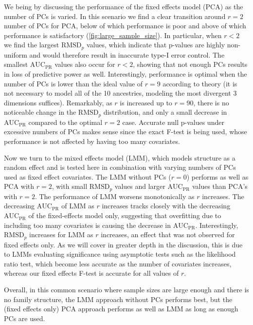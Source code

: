 \documentclass[11pt]{article}
\newcommand{\rmsd}{\text{RMSD}_p}
\newcommand{\auc}{\text{AUC}_\text{PR}}
\begin{document}
We being by discussing the performance of the fixed effects model (PCA) as the number of PCs is varied.
In this scenario we find a clear transition around $r = 2$ number of PCs for PCA, below of which performance is poor and above of which performance is satisfactory (\cref{fig:large_sample_size}).
In particular, when $r < 2$ we find the largest $\rmsd$ values, which indicate that p-values are highly non-uniform and would therefore result in inaccurate type-I error control.
The smallest $\auc$ values also occur for $r < 2$, showing that not enough PCs results in loss of predictive power as well.
Interestingly, performance is optimal when the number of PCs is lower than the ideal value of $r=9$ according to theory (it is not necessary to model all of the 10 ancestries, modeling the most divergent 3 dimensions suffices).
Remarkably, as $r$ is increased up to $r = 90$, there is no noticeable change in the $\rmsd$ distribution, and only a small decrease in $\auc$ compared to the optimal $r = 2$ case.
Accurate null p-values under excessive numbers of PCs makes sense since the exact F-test is being used, whose performance is not affected by having too many covariates.

Now we turn to the mixed effects model (LMM), which models structure as a random effect and is tested here in combination with varying numbers of PCs used as fixed effect covariates.
The LMM without PCs ($r=0$) performs as well as PCA with $r = 2$, with small $\rmsd$ values and larger $\auc$ values than PCA's with $r=2$.
The performance of LMM worsens monotonically as $r$ increases.
The decreasing $\auc$ of LMM as $r$ increases tracks closely with the decreasing $\auc$ of the fixed-effects model only, suggesting that overfitting due to including too many covariates is causing the decrease in $\auc$.
Interestingly, $\rmsd$ increases for LMM as $r$ increases, an effect that was not observed for fixed effects only.
As we will cover in greater depth in the discussion, this is due to LMMs evaluating significance using asymptotic tests such as the likelihood ratio test, which become less accurate as the number of covariates increases, whereas our fixed effects F-test is accurate for all values of $r$.

Overall, in this common scenario where sample sizes are large enough and there is no family structure, the LMM approach without PCs performs best, but the (fixed effects only) PCA approach performs as well as LMM as long as enough PCs are used.
\end{document}
